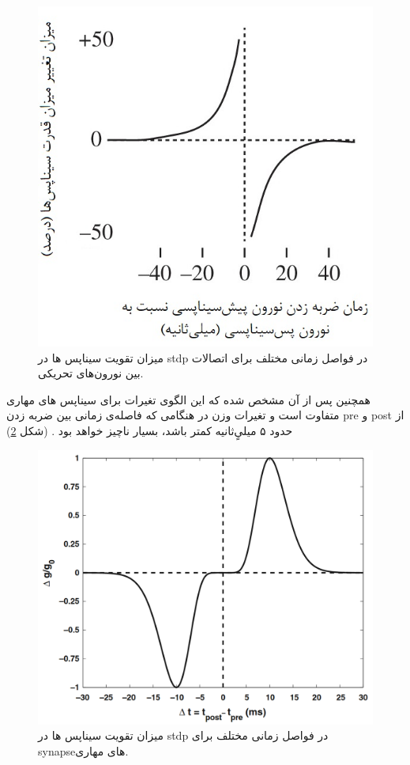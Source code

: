 \documentclass[12pt]{report}
\begin{document}
	
	\begin{figure}[H]
		\centering
		\includegraphics[width=0.7\linewidth]{stdp.jpg}
		\caption[NS]{
			میزان تقویت سیناپس ها در \gls{stdp} در فواصل زمانی مختلف برای اتصالات بین نورون‌های تحریکی.
		}
		\label{fig:stdp}
	\end{figure}

	همچنین پس از آن مشخص شده که این الگوی تغیرات برای سیناپس های مهاری متفاوت است و تغیرات وزن در هنگامی که فاصله‌ی زمانی بین ضربه زدن \gls{pre} و \gls{post} از حدود ۵ میلیٍ‌ثانیه کمتر باشد، بسیار ناچیز خواهد بود \cite{Haas2006}. (شکل \ref{fig:stdp-inh})
	
	\begin{figure}[H]
		\centering
		\includegraphics[width=0.7\linewidth]{stdp-inh.png}
		\caption[NS]{
			میزان تقویت سیناپس ها در \gls{stdp} در فواصل زمانی مختلف برای \gls{synapse}‌های مهاری.
		}
		\label{fig:stdp-inh}
	\end{figure}
	
\end{document}
